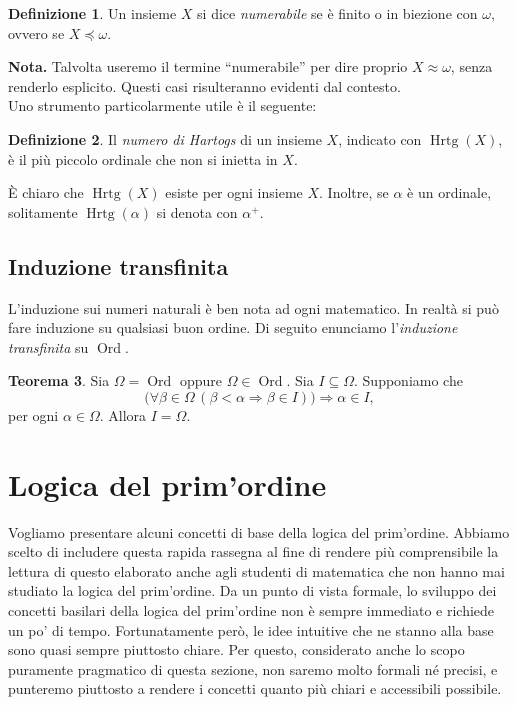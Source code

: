 \documentclass[12pt,a4paper]{report}
\theoremstyle{definition}
\newtheorem{teo}{Teorema}[section]  %
\newtheorem{defn}[teo]{Definizione}  %
\theoremstyle{num.custom-title}
\DeclareMathOperator{\Hrtg}{\text{Hrtg}}
\DeclareMathOperator{\Ord}{\text{Ord}}
\DeclareMathOperator{\imp}{\Rightarrow}
\begin{document}
\begin{defn}
Un insieme $X$ si dice \emph{numerabile} se è finito o in biezione con $\omega$, ovvero se $X \preceq \omega$.
\end{defn}

\noindent\textbf{Nota.} Talvolta useremo il termine ``numerabile'' per dire proprio $X \approx \omega$, senza renderlo esplicito. Questi casi risulteranno evidenti dal contesto.\\

Uno strumento particolarmente utile è il seguente:

\begin{defn}
Il \emph{numero di Hartogs} di un insieme $X$, indicato con $\Hrtg(X)$, è il più piccolo ordinale che non si inietta in $X$. 
\end{defn}

È chiaro che $\Hrtg(X)$ esiste per ogni insieme $X$. Inoltre, se $\alpha$ è un ordinale, solitamente $\Hrtg(\alpha)$ si denota con $\alpha^+$.



\subsection{Induzione transfinita}

L'induzione sui numeri naturali è ben nota ad ogni matematico. In realtà si può fare induzione su qualsiasi buon ordine. Di seguito enunciamo l'\emph{induzione transfinita} su $\Ord$.

\begin{teo}
Sia $\Omega=\Ord$ oppure $\Omega \in \Ord$. Sia $I \subseteq \Omega$. Supponiamo che 
\[
\big(\forall \beta \in \Omega \, (\beta < \alpha \imp \beta \in I)\big) \imp \alpha \in I,
\]
per ogni $\alpha \in \Omega$. Allora $I=\Omega$.
\end{teo}


\section{Logica del prim'ordine}

Vogliamo presentare alcuni concetti di base della logica del prim'ordine. Abbiamo scelto di includere questa rapida rassegna al fine di rendere più comprensibile la lettura di questo elaborato anche agli studenti di matematica che non hanno mai studiato la logica del prim'ordine. Da un punto di vista formale, lo sviluppo dei concetti basilari della logica del prim'ordine non è sempre immediato e richiede un po' di tempo. Fortunatamente però, le idee intuitive che ne stanno alla base sono quasi sempre piuttosto chiare. Per questo, considerato anche lo scopo puramente pragmatico di questa sezione, non saremo molto formali né precisi, e punteremo piuttosto a rendere i concetti quanto più chiari e accessibili possibile.
\end{document}
